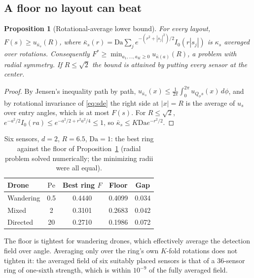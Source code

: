 \documentclass[11pt]{article}
\newtheorem{proposition}[theorem]{Proposition}
\theoremstyle{remark}
\newcommand{\Da}{\mathrm{Da}}
\newcommand{\Pe}{\mathrm{Pe}}
\begin{document}
\subsection{A floor no layout can beat}
\begin{proposition}[Rotational-average lower bound]\label{prop:floor}
For every layout, $F(s)\ge u_{\bar\kappa_s}(R)$, where
$\bar\kappa_s(r)=\Da\sum_je^{-(r^2+|s_j|^2)/2}I_0(r|s_j|)$ is $\kappa_s$ averaged over
rotations. Consequently $F^*\ge\min_{a_1,\dots,a_K\ge0}u_{\bar\kappa(a)}(R)$, a problem with
radial symmetry. If $R\le\sqrt2$ the bound is attained by putting every sensor at the center.
\end{proposition}
\begin{proof}
By Jensen's inequality path by path,
$u_{\bar\kappa_s}(x)\le\frac1{2\pi}\int_0^{2\pi}u_{Q_\phi s}(x)\,d\phi$, and by rotational
invariance of \eqref{eq:sde} the right side at $|x|=R$ is the average of $u_s$ over entry
angles, which is at most $F(s)$. For $R\le\sqrt2$,
$e^{-a^2/2}I_0(ra)\le e^{-a^2/2+r^2a^2/4}\le1$, so $\bar\kappa_s\le K\Da e^{-r^2/2}$.
\end{proof}

\begin{table}[h]\centering
\caption{Six sensors, $d=2$, $R=6.5$, $\Da=1$: the best ring against the floor of
Proposition~\ref{prop:floor} (radial problem solved numerically; the minimizing radii were
all equal).}\label{tab:floor}
\begin{tabular}{@{}lcccc@{}}\toprule
Drone & $\Pe$ & Best ring $F$ & Floor & Gap\\\midrule
Wandering & 0.5 & 0.4440 & 0.4099 & 0.034\\
Mixed & 2 & 0.3101 & 0.2683 & 0.042\\
Directed & 20 & 0.2710 & 0.1986 & 0.072\\\bottomrule
\end{tabular}
\end{table}
The floor is tightest for wandering drones, which effectively average the detection field over
angle. Averaging only over the ring's own $K$-fold rotations does not tighten it: the averaged
field of six suitably placed sensors is that of a 36-sensor ring of one-sixth strength, which
is within $10^{-9}$ of the fully averaged field.
\end{document}
